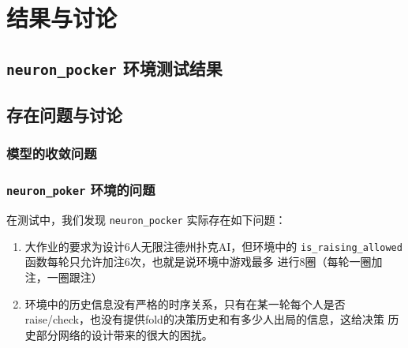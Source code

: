 \documentclass[11pt]{article}
\begin{document}
\section{结果与讨论}
\label{sec:org9cbaef5}
\subsection{\texttt{neuron\_pocker} 环境测试结果}
\label{sec:org7b5b308}



\subsection{存在问题与讨论}
\label{sec:orgfb245b2}
\subsubsection{模型的收敛问题}
\label{sec:org9516eb9}
\subsubsection{\texttt{neuron\_poker} 环境的问题}
\label{sec:org32cde1b}
在测试中，我们发现 \texttt{neuron\_pocker} 实际存在如下问题：
\begin{enumerate}
\item 大作业的要求为设计6人无限注德州扑克AI，但环境中的
\texttt{is\_raising\_allowed} 函数每轮只允许加注6次，也就是说环境中游戏最多
进行8圈（每轮一圈加注，一圈跟注）
\item 环境中的历史信息没有严格的时序关系，只有在某一轮每个人是否
raise/check，也没有提供fold的决策历史和有多少人出局的信息，这给决策
历史部分网络的设计带来的很大的困扰。
\end{enumerate}

\nocite{moravcik17_deeps}



\end{document}
